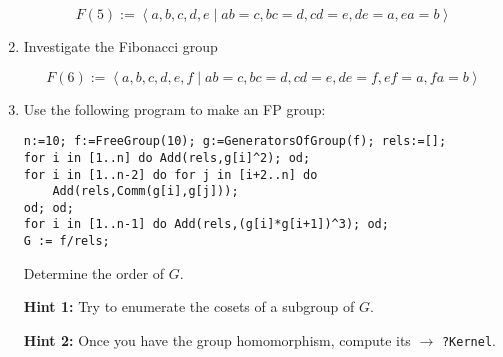 \documentclass[12pt]{article}
\newcommand{\hint}[1]{\par\textbf{Hint #1:}}
\newcommand{\see}[1]{$\to$ \texttt{?#1}}
\begin{document}
\begin{enumerate}
\vspace*{-2mm}
\[ F(5) := \left< a,b,c,d,e \mid ab=c, bc=d, cd=e, de=a, ea=b \right> \]

\vspace*{-2mm}
\item Investigate the Fibonacci group 

\vspace*{-2mm}
\[ F(6) := \left< a,b,c,d,e,f \mid ab=c, bc=d, cd=e, de=f, ef=a, fa=b \right> \]

\vspace*{-2mm}
\item Use the following program to make an FP group:
{\small \begin{verbatim}
n:=10; f:=FreeGroup(10); g:=GeneratorsOfGroup(f); rels:=[];
for i in [1..n] do Add(rels,g[i]^2); od;
for i in [1..n-2] do for j in [i+2..n] do 
    Add(rels,Comm(g[i],g[j])); 
od; od;
for i in [1..n-1] do Add(rels,(g[i]*g[i+1])^3); od;
G := f/rels;
\end{verbatim}}
Determine the order of $G$.
\hint{1} Try to enumerate the cosets of a subgroup of $G$.
\hint{2} Once you have the group homomorphism, compute its \see{Kernel}.
\end{enumerate}
\end{document}
